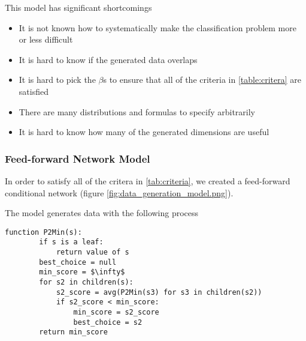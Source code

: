 \documentclass{article}
\begin{document}
This model has significant shortcomings
\begin{itemize}
    \item It is not known how to systematically make the classification problem
        more or less difficult
    \item It is hard to know if the generated data overlaps
    \item It is hard to pick the $\beta$s to ensure that all of the criteria in
        \ref{table:critera} are satisfied
    \item There are many distributions and formulas to specify arbitrarily
    \item It is hard to know how many of the generated dimensions are useful
\end{itemize}


\subsubsection{Feed-forward Network Model}

In order to satisfy all of the critera in \ref{tab:criteria}, we created a
feed-forward conditional network (figure \ref{fig:data_generation_model.png}).

The model generates data with the following process

\begin{lstlisting}[]
    function P2Min(s):
        if s is a leaf:
            return value of s
        best_choice = null
        min_score = $\infty$
        for s2 in children(s):
            s2_score = avg(P2Min(s3) for s3 in children(s2))
            if s2_score < min_score:
                min_score = s2_score
                best_choice = s2
        return min_score
\end{lstlisting}
\end{document}
